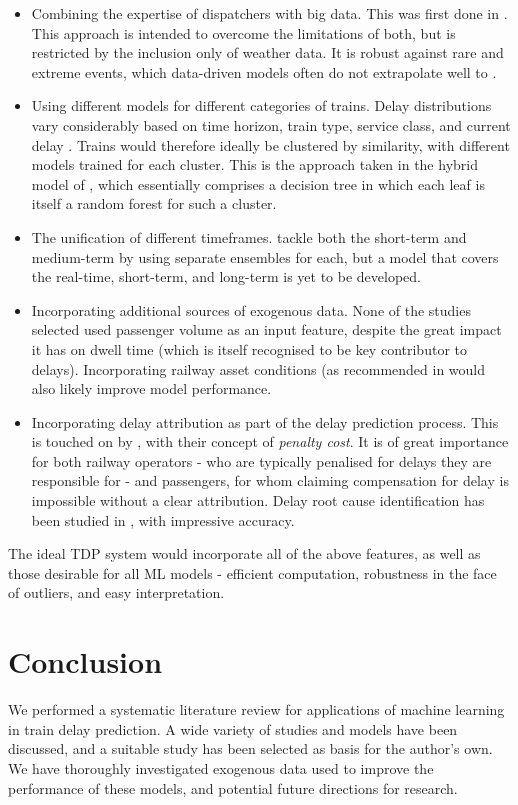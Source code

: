 \documentclass{article}
\begin{document}
\begin {itemize}
	\item Combining the expertise of dispatchers with big data. This was first done in \cite{oneto_et_al_2019}. This approach is intended to overcome the limitations of both, but is restricted by the inclusion only of weather data. It is robust against rare and extreme events, which data-driven models often do not extrapolate well to \cite{barbour_et_al_2018}.
	\item Using different models for different categories of trains. Delay distributions vary considerably based on time horizon, train type, service class, and current delay \cite{nair_et_al_2019}. Trains would therefore ideally be clustered by similarity, with different models trained for each cluster. This is the approach taken in the hybrid model of \cite{oneto_et_al_2019}, which essentially comprises a decision tree in which each leaf is itself a random forest for such a cluster. 
	\item The unification of different timeframes. \cite{nair_et_al_2019} tackle both the short-term and medium-term by using separate ensembles for each, but a model that covers the real-time, short-term, and long-term  is yet to be developed.
	\item Incorporating additional sources of exogenous data. None of the studies selected used passenger volume as an input feature, despite the great impact it has on dwell time (which is itself recognised to be key contributor to delays). Incorporating railway asset conditions (as recommended in \cite{oneto_et_al_2017a} would also likely improve model performance. 
	\item Incorporating delay attribution as part of the delay prediction process. This is touched on by \cite{oneto_et_al_2019}, with their concept of \textit{penalty cost}. It is of great importance for both railway operators - who are typically penalised for delays they are responsible for - and passengers, for whom claiming compensation for delay is impossible without a clear attribution. Delay root cause identification has been studied in \cite{lee_et_al_2016}, with impressive accuracy.
\end {itemize}

The ideal TDP system would incorporate all of the above features, as well as those desirable for all ML models - efficient computation, robustness in the face of outliers, and easy interpretation. 

\section{Conclusion}

We performed a systematic literature review for applications of machine learning in train delay prediction. A wide variety of studies and models have been discussed, and a suitable study \cite{nair_et_al_2019} has been selected as basis for the author's own. We have thoroughly investigated exogenous data used to improve the performance of these models, and potential future directions for research.

\printbibliography
 
\end{document}
